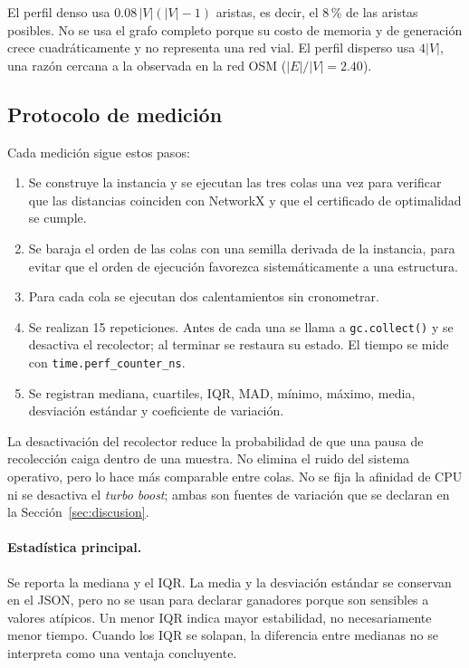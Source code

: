 El perfil denso usa $0.08\,|V|(|V|-1)$ aristas, es decir, el 8\,\% de las aristas posibles. No se usa el grafo completo porque su costo de memoria y de generación crece cuadráticamente y no representa una red vial. El perfil disperso usa $4|V|$, una razón cercana a la observada en la red OSM ($|E|/|V|=2.40$).

\subsection{Protocolo de medición}
Cada medición sigue estos pasos:
\begin{enumerate}
    \item Se construye la instancia y se ejecutan las tres colas una vez para verificar que las distancias coinciden con NetworkX y que el certificado de optimalidad se cumple.
    \item Se baraja el orden de las colas con una semilla derivada de la instancia, para evitar que el orden de ejecución favorezca sistemáticamente a una estructura.
    \item Para cada cola se ejecutan dos calentamientos sin cronometrar.
    \item Se realizan 15 repeticiones. Antes de cada una se llama a \texttt{gc.collect()} y se desactiva el recolector; al terminar se restaura su estado. El tiempo se mide con \texttt{time.perf\_counter\_ns}.
    \item Se registran mediana, cuartiles, IQR, MAD, mínimo, máximo, media, desviación estándar y coeficiente de variación.
\end{enumerate}
La desactivación del recolector reduce la probabilidad de que una pausa de recolección caiga dentro de una muestra. No elimina el ruido del sistema operativo, pero lo hace más comparable entre colas. No se fija la afinidad de CPU ni se desactiva el \textit{turbo boost}; ambas son fuentes de variación que se declaran en la Sección~\ref{sec:discusion}.

\paragraph{Estadística principal.} Se reporta la mediana y el IQR. La media y la desviación estándar se conservan en el JSON, pero no se usan para declarar ganadores porque son sensibles a valores atípicos. Un menor IQR indica mayor estabilidad, no necesariamente menor tiempo. Cuando los IQR se solapan, la diferencia entre medianas no se interpreta como una ventaja concluyente.

